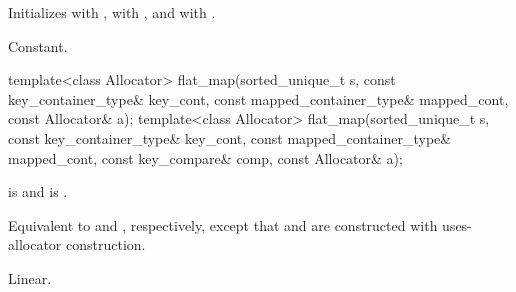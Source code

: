 \begin{itemdescr}
\pnum
\effects
Initializes
 with ,
 with , and
 with .

\pnum
\complexity
Constant.
\end{itemdescr}

%
\begin{itemdecl}
template<class Allocator>
  flat_map(sorted_unique_t s, const key_container_type& key_cont,
           const mapped_container_type& mapped_cont, const Allocator& a);
template<class Allocator>
  flat_map(sorted_unique_t s, const key_container_type& key_cont,
           const mapped_container_type& mapped_cont, const key_compare& comp,
           const Allocator& a);
\end{itemdecl}

\begin{itemdescr}
\pnum
\constraints
{} is  and
 is .

\pnum
\effects
Equivalent to  and
, respectively,
except that  and  are constructed
with uses-allocator construction.

\pnum
\complexity
Linear.
\end{itemdescr}

